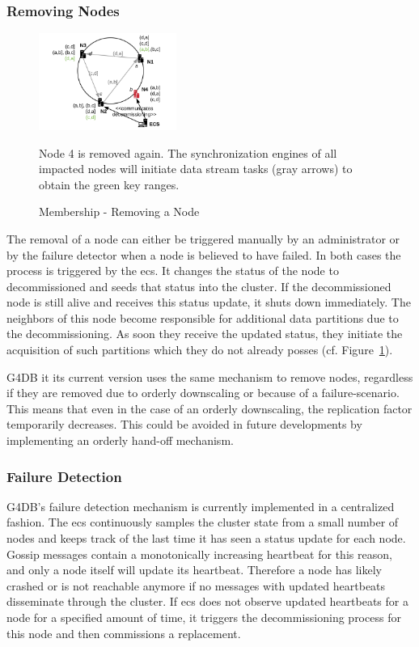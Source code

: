 
\subsubsection{Removing Nodes}
\label{sec:remove-node}

\begin{figure}[]
	\centering
	\includegraphics[width=0.4\textwidth]{resources/remove-node}
	\caption{Membership - Removing a Node}
	\label{fig:remove-node}
	{
	Node 4 is removed again.
	The synchronization engines of all impacted nodes will initiate data stream tasks (gray arrows) to obtain the green key ranges.
	}
\end{figure}

The removal of a node can either be triggered manually by an administrator
or by the failure detector when a node is believed to have failed.
In both cases the process is triggered by the \ac{ecs}.
It changes the status of the node to decommissioned and seeds that status
into the cluster.
If the decommissioned node is still alive and receives this status update, it
shuts down immediately.
The neighbors of this node become responsible for additional data partitions
due to the decommissioning.
As soon they receive the updated status, they initiate the acquisition of
such partitions which they do not already posses (cf. Figure~\ref{fig:remove-node}).

G4DB it its current version uses the same mechanism to remove nodes, regardless if
they are removed due to orderly downscaling or because of a failure-scenario.
This means that even in the case of an orderly downscaling, the replication factor
temporarily decreases.
This could be avoided in future developments by implementing
an orderly hand-off mechanism.

\subsubsection{Failure Detection}
G4DB's failure detection mechanism is currently implemented in a centralized fashion.
The \ac{ecs} continuously samples the cluster state from a small number of nodes
and keeps track of the last time it has seen a status update for each node.
Gossip messages contain a monotonically increasing heartbeat for this reason,
and only a node itself will update its heartbeat.
Therefore a node has likely crashed or is not reachable anymore if no
messages with updated heartbeats disseminate through the cluster.
If \ac{ecs} does not observe updated heartbeats for a node for a specified
amount of time, it triggers the decommissioning process for this node and
then commissions a replacement.

